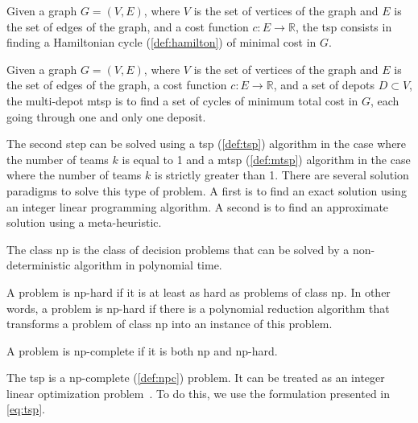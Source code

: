 \begin{definition}
	\label{def:tsp}
	Given a graph $G = (V, E)$, where $V$ is the set of vertices of the graph and $E$ is the set of edges of the graph, and a cost function $c : E \rightarrow \mathbb{R}$, the \gls{tsp} consists in finding a Hamiltonian cycle (\ref{def:hamilton}) of minimal cost in $G$.
\end{definition}

\begin{definition}
	\label{def:mtsp}
	Given a graph $G = (V, E)$, where $V$ is the set of vertices of the graph and $E$ is the set of edges of the graph, a cost function $c : E \rightarrow \mathbb{R}$, and a set of depots $D \subset V$, the multi-depot \gls{mtsp} is to find a set of cycles of minimum total cost in $G$, each going through one and only one deposit.
\end{definition}

The second step can be solved using a \gls{tsp} (\ref{def:tsp}) algorithm in the case where the number of teams $k$ is equal to 1 and a \gls{mtsp} (\ref{def:mtsp}) algorithm in the case where the number of teams $k$ is strictly greater than 1.
There are several solution paradigms to solve this type of problem.
A first is to find an exact solution using an integer linear programming algorithm.
A second is to find an approximate solution using a meta-heuristic.

\begin{definition}
	\label{def:np}
	The class \gls{np} is the class of decision problems that can be solved by a non-deterministic algorithm in polynomial time.
\end{definition}

\begin{definition}
	\label{def:nph}
	A problem is \gls{np}-hard if it is at least as hard as problems of class \gls{np}.
	In other words, a problem is \gls{np}-hard if there is a polynomial reduction algorithm that transforms a problem of class \gls{np} into an instance of this problem.
\end{definition}

\begin{definition}
	\label{def:npc}
	A problem is \gls{np}-complete if it is both \gls{np} and \gls{np}-hard.
\end{definition}

The \gls{tsp} is a \gls{np}-complete (\ref{def:npc}) problem.
It can be treated as an integer linear optimization problem~\cite{article244, gurobi25}.
To do this, we use the formulation presented in \ref{eq:tsp}.

